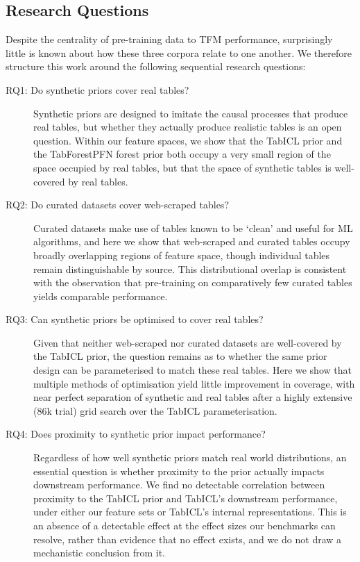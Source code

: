 \documentclass{article}
\begin{document}
\subsection{Research Questions}
Despite the centrality of pre-training data to TFM performance, surprisingly little is known about how these three corpora relate to one another.
We therefore structure this work around the following sequential research questions:
\begin{description}
    \item[RQ1: Do synthetic priors cover real tables?]
    Synthetic priors are designed to imitate the causal processes that produce real tables, but whether they actually produce realistic tables is an open question. Within our feature spaces, we show that the TabICL prior and the TabForestPFN forest prior both occupy a very small region of the space occupied by real tables, but that the space of synthetic tables is well-covered by real tables.

    \item[RQ2: Do curated datasets cover web-scraped tables?]
    Curated datasets make use of tables known to be `clean' and useful for ML algorithms, and here we show that web-scraped and curated tables occupy broadly overlapping regions of feature space, though individual tables remain distinguishable by source. This distributional overlap is consistent with the observation that pre-training on comparatively few curated tables yields comparable performance.


    \item[RQ3: Can synthetic priors be optimised to cover real tables?]
    Given that neither web-scraped nor curated datasets are well-covered by the TabICL prior, the question remains as to whether the same prior design can be parameterised to match these real tables. Here we show that multiple methods of optimisation yield little improvement in coverage, with near perfect separation of synthetic and real tables after a highly extensive (86k trial) grid search over the TabICL parameterisation.

    \item[RQ4: Does proximity to synthetic prior impact performance?]
    Regardless of how well synthetic priors match real world distributions, an essential question is whether proximity to the prior actually impacts downstream performance.
    We find no detectable correlation between proximity to the TabICL prior and TabICL's downstream performance, under either our feature sets or TabICL's internal representations. This is an absence of a detectable effect at the effect sizes our benchmarks can resolve, rather than evidence that no effect exists, and we do not draw a mechanistic conclusion from it.

\end{description}
\end{document}
